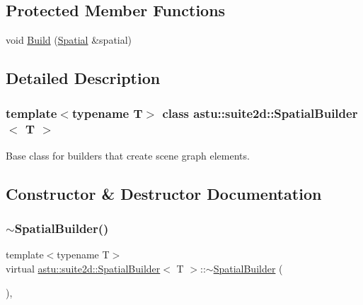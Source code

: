 \subsection*{Protected Member Functions}
\begin{DoxyCompactItemize}
\item 
void \hyperlink{classastu_1_1suite2d_1_1SpatialBuilder_a3d46a0e8a8fac126c7d926361a78cb82}{Build} (\hyperlink{classastu_1_1suite2d_1_1Spatial}{Spatial} \&spatial)
\end{DoxyCompactItemize}


\subsection{Detailed Description}
\subsubsection*{template$<$typename T$>$\newline
class astu\+::suite2d\+::\+Spatial\+Builder$<$ T $>$}

Base class for builders that create scene graph elements. 

\subsection{Constructor \& Destructor Documentation}
\mbox{\label{classastu_1_1suite2d_1_1SpatialBuilder_a8c525562114d436d4ccfc2cc42e7658a}} 
\subsubsection{\texorpdfstring{$\sim$\+Spatial\+Builder()}{~SpatialBuilder()}}
{\footnotesize\ttfamily template$<$typename T$>$ \\
virtual \hyperlink{classastu_1_1suite2d_1_1SpatialBuilder}{astu\+::suite2d\+::\+Spatial\+Builder}$<$ T $>$\+::$\sim$\hyperlink{classastu_1_1suite2d_1_1SpatialBuilder}{Spatial\+Builder} (\begin{DoxyParamCaption}{ }\end{DoxyParamCaption})\hspace{0.3cm}{\ttfamily [inline]}, {\ttfamily [virtual]}}

